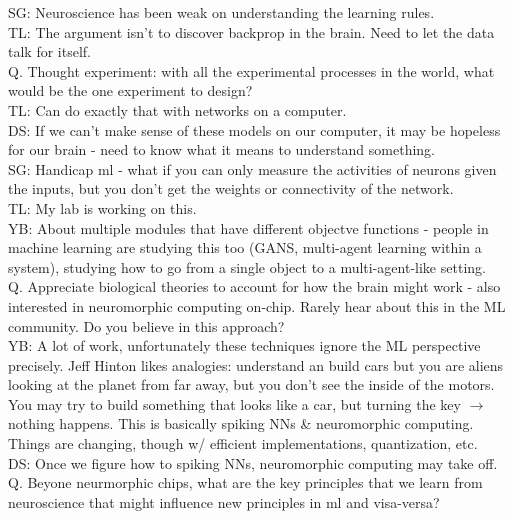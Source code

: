 \documentclass[12pt]{article}
\begin{document}
SG: Neuroscience has been weak on understanding the learning rules. \\

TL: The argument isn't to discover backprop in the brain. Need to let the data talk for itself. \\

Q. Thought experiment: with all the experimental processes in the world, what would be the one experiment to design? \\

TL: Can do exactly that with networks on a computer. \\

DS: If we can't make sense of these models on our computer, it may be hopeless for our brain - need to know what it means to understand something. \\

SG: Handicap ml - what if you can only measure the activities of neurons given the inputs, but you don't get the weights or connectivity of the network. \\

TL: My lab is working on this. \\

YB: About multiple modules that have different objectve functions - people in machine learning are studying this too (GANS, multi-agent learning within a system), studying how to go from a single object to a multi-agent-like setting. \\

Q. Appreciate biological theories to account for how the brain might work - also interested in neuromorphic computing on-chip. Rarely hear about this in the ML community. Do you believe in this approach? \\

YB: A lot of work, unfortunately these techniques ignore the ML perspective precisely. Jeff Hinton likes analogies: understand an build cars but you are aliens looking at the planet from far away, but you don't see the inside of the motors. You may try to build something that looks like a car, but turning the key $\rightarrow$ nothing happens. This is basically spiking NNs \& neuromorphic computing. Things are changing, though w/ efficient implementations, quantization, etc. \\

DS: Once we figure how to spiking NNs, neuromorphic computing may take off. \\

Q. Beyone neurmorphic chips, what are the key principles that we learn from neuroscience that might influence new principles in ml and visa-versa? \\
\end{document}

